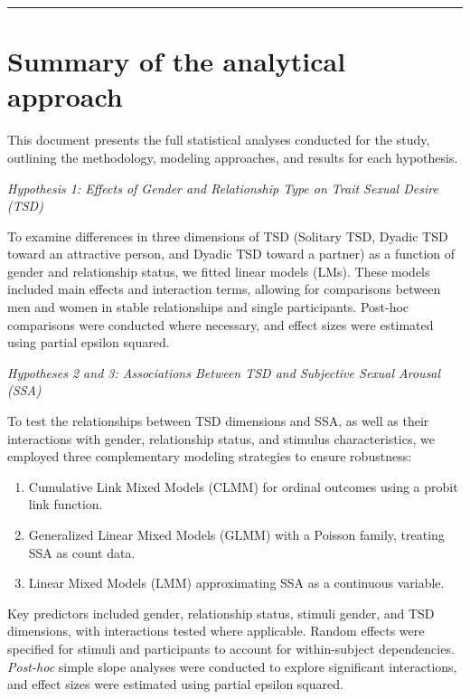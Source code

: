 \documentclass[
  bookmarksnumbered]{article}
\providecommand{\tightlist}{%
  \setlength{\itemsep}{0pt}\setlength{\parskip}{0pt}}
\begin{document}
\par
\endgroup

{\hypersetup{hidelinks}
\setcounter{tocdepth}{6}
\tableofcontents
}
\opensupplement

\begin{center}\rule{0.5\linewidth}{0.5pt}\end{center}

\section{Summary of the analytical approach}\label{summary-of-the-analytical-approach}

This document presents the full statistical analyses conducted for the study, outlining the methodology, modeling approaches, and results for each hypothesis.

\emph{Hypothesis 1: Effects of Gender and Relationship Type on Trait Sexual Desire (TSD)}

To examine differences in three dimensions of TSD (Solitary TSD, Dyadic TSD toward an attractive person, and Dyadic TSD toward a partner) as a function of gender and relationship status, we fitted linear models (LMs). These models included main effects and interaction terms, allowing for comparisons between men and women in stable relationships and single participants. Post-hoc comparisons were conducted where necessary, and effect sizes were estimated using partial epsilon squared.

\emph{Hypotheses 2 and 3: Associations Between TSD and Subjective Sexual Arousal (SSA)}

To test the relationships between TSD dimensions and SSA, as well as their interactions with gender, relationship status, and stimulus characteristics, we employed three complementary modeling strategies to ensure robustness:

\begin{enumerate}
\def\labelenumi{\arabic{enumi}.}
\tightlist
\item
  Cumulative Link Mixed Models (CLMM) for ordinal outcomes using a probit link function.
\item
  Generalized Linear Mixed Models (GLMM) with a Poisson family, treating SSA as count data.
\item
  Linear Mixed Models (LMM) approximating SSA as a continuous variable.
\end{enumerate}

Key predictors included gender, relationship status, stimuli gender, and TSD dimensions, with interactions tested where applicable. Random effects were specified for stimuli and participants to account for within-subject dependencies. \emph{Post-hoc} simple slope analyses were conducted to explore significant interactions, and effect sizes were estimated using partial epsilon squared.
\end{document}
